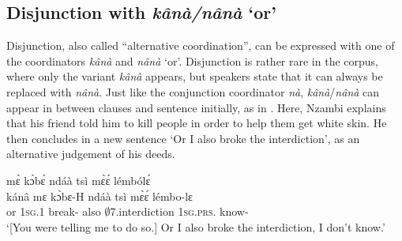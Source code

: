 




\subsection{Disjunction with {\itshape kânà/nânà} `or'}
\label{sec:Disjunction}

Disjunction, also called ``alternative coordination'', can be expressed with one of the coordinators {\itshape kânà} and {\itshape nânà} `or'. Disjunction is rather rare in the corpus, where only the variant {\itshape kânà} appears, but speakers state that it can always be replaced with {\itshape nânà}. Just like the conjunction coordinator {\itshape nà}, {\itshape kânà}/{\itshape nânà} can appear in between clauses and sentence initially, as in . Here, Nzambi explains that his friend told him to kill people in order to help them get white skin. He then concludes in a new sentence `Or I also broke the interdiction', as an alternative judgement of his deeds.


\ea\label{or} 
   mɛ̀ kɔ̀bɛ́ ndáà tsì mɛ̀ɛ́ lémbólɛ́\\
        kánâ mɛ kɔ̀bɛ-H ndáà tsì mɛ̀ɛ́ lémbo-lɛ\\
        or 1\textsc{sg}.{\PST}1 break-{\R} also $\emptyset$7.interdiction 1\textsc{sg}.\textsc{prs}.{\NEG} know-{\NEG} \\
    \trans `[You were telling me to do so.] Or I also broke the interdiction, I don't know.'
\z

